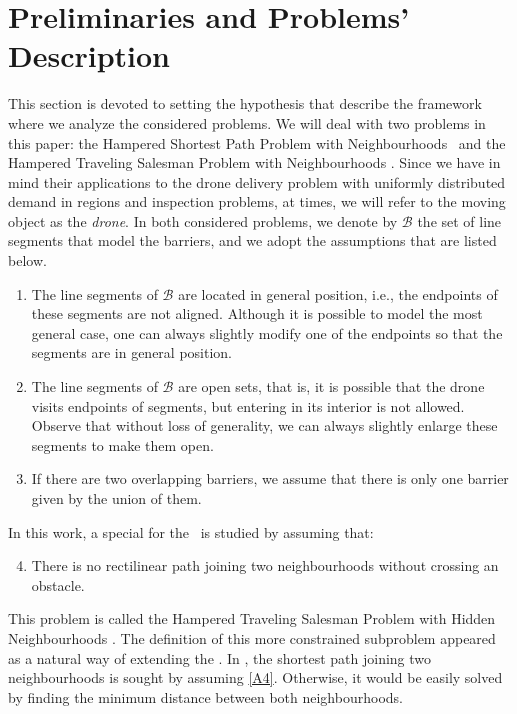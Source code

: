 \documentclass[a4paper,  review, authoryear, 1p.]{elsarticle}
\newcommand{\SPPN}{{\sf{H-SPPN}\xspace }}
\newcommand{\TSPHN}{{\sf{H-TSPHN}\xspace }}
\newcommand{\TSPN}{{\sf{H-TSPN}\xspace }}
\newcommand{\CV}[1]{{\color{red}#1}}
\begin{document}
		
		\section{Preliminaries and Problems'  Description \label{section:description}}
		This section is devoted to setting the hypothesis that describe the framework where we analyze the considered problems.
		We will deal with two problems in this paper: the Hampered Shortest Path Problem with Neighbourhoods \SPPN \ and the Hampered Traveling Salesman Problem with Neighbourhoods \TSPN. Since we have in mind their applications to the drone delivery problem with uniformly distributed demand in regions and inspection problems, at times, we will refer to the moving object as the \textit{drone}. In both considered problems, we denote by $\mathcal{B}$ the set of line segments that model the barriers, and we adopt the  assumptions that are listed below.
		
		\begin{enumerate}[label=\textbf{A\arabic*},ref=\textbf{A\arabic*}]
			\item \label{A1}The line segments of $\mathcal B$ are located in general position, i.e., the endpoints of these segments are not aligned. Although it is possible to model the most general case, one can always slightly modify one of the endpoints so that the segments are in general position.
			\item The line segments of $\mathcal B$ are open sets, that is, it is possible that the drone visits endpoints of segments, but entering  in its interior is not allowed. Observe that without loss of generality, we can always slightly enlarge these segments to make them open.
			\item \label{A3}If there are two overlapping barriers, we assume that there is only one barrier given by the union of them.
		\end{enumerate}

		\CV{In this work, a special for the \TSPN \ is studied by assuming that:
		\begin{enumerate}[label=\textbf{A\arabic*}, ref=\textbf{A\arabic*}]
			\setcounter{enumi}{3}
			\item \label{A4}There is no rectilinear path joining two neighbourhoods without crossing an obstacle.
		\end{enumerate} 
		This problem is called the Hampered Traveling Salesman Problem with Hidden Neighbourhoods \TSPHN. The definition of this more constrained subproblem appeared as a natural way of extending the \SPPN. In \SPPN, the shortest path joining two neighbourhoods is sought by assuming \ref{A4}. Otherwise, it would be easily solved by finding the minimum distance between both neighbourhoods.

		}
\end{document}
